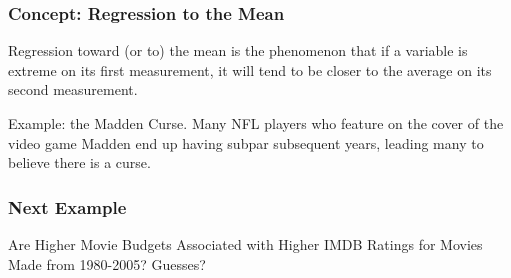 \documentclass[slides]{beamer}
\newcommand{\blue}[1]{\textcolor{blue2}{#1}}
\begin{document}
\begin{frame}[fragile]
\frametitle{Concept: Regression to the Mean}

Regression toward (or to) the mean is the phenomenon that if a variable is extreme on its first measurement, it will tend to be closer to the average on its second measurement.

\vspace{0.5cm}

Example: the Madden Curse.  Many NFL players who feature on the cover of the video game Madden end up having subpar subsequent years, leading many to believe there is a curse.



\end{frame}


\begin{frame}[fragile]
\frametitle{Next Example}
Are Higher Movie Budgets Associated with Higher IMDB Ratings for Movies Made from 1980-2005?  Guesses?

\end{frame}



%
%
%
%
%
\end{document}
